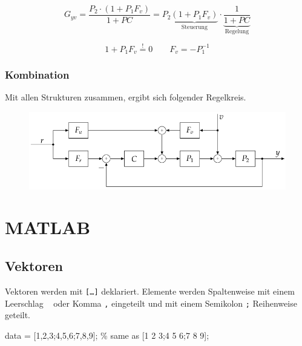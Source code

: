 \documentclass[
  10pt,
  a4paper,
  twocolumn]{article}
\newenvironment{Shaded}{}{}
\newcommand{\CommentTok}[1]{\textcolor[rgb]{0.42,0.45,0.49}{#1}}
\newcommand{\FloatTok}[1]{\textcolor[rgb]{0.00,0.36,0.77}{#1}}
\newcommand{\NormalTok}[1]{\textcolor[rgb]{0.14,0.16,0.18}{#1}}
\newcommand{\OperatorTok}[1]{\textcolor[rgb]{0.14,0.16,0.18}{#1}}
\newcommand{\VariableTok}[1]{\textcolor[rgb]{0.89,0.38,0.04}{#1}}
\numberwithin{equation}{section}
\begin{document}
\[
G_{yv} = \frac{P_2\cdot(1 + P_1F_v)}{1 + PC}= P_2\underbrace{(1 + P_1F_v)}_{\text{Steuerung}}\cdot\underbrace{\frac1{1+PC}}_{\text{Regelung}}
\]

\[
1+P_1F_v \stackrel{!}{=}0\qquad F_v = -P_1^{-1}
\]

\hypertarget{kombination}{%
\subsubsection{Kombination}\label{kombination}}

Mit allen Strukturen zusammen, ergibt sich folgender Regelkreis.

\begin{figure}[H]

{\centering \includegraphics{images/paste-54.png}

}

\end{figure}

\hypertarget{matlab}{%
\section{MATLAB}\label{matlab}}

\hypertarget{vektoren}{%
\subsection{Vektoren}\label{vektoren}}

Vektoren werden mit \texttt{{[}…{]}} deklariert. Elemente werden
Spaltenweise mit einem Leerschlag
\texttt{\textquotesingle{}\ \textquotesingle{}} oder Komma \texttt{,}
eingeteilt und mit einem Semikolon \texttt{;} Reihenweise geteilt.

\begin{Shaded}
\begin{Highlighting}[]
\VariableTok{data} \OperatorTok{=}\NormalTok{ [}\FloatTok{1}\OperatorTok{,}\FloatTok{2}\OperatorTok{,}\FloatTok{3}\OperatorTok{;}\FloatTok{4}\OperatorTok{,}\FloatTok{5}\OperatorTok{,}\FloatTok{6}\OperatorTok{;}\FloatTok{7}\OperatorTok{,}\FloatTok{8}\OperatorTok{,}\FloatTok{9}\NormalTok{]}\OperatorTok{;} \CommentTok{\% same as [1 2 3;4 5 6;7 8 9];}
\end{Highlighting}
\end{Shaded}
\end{document}

